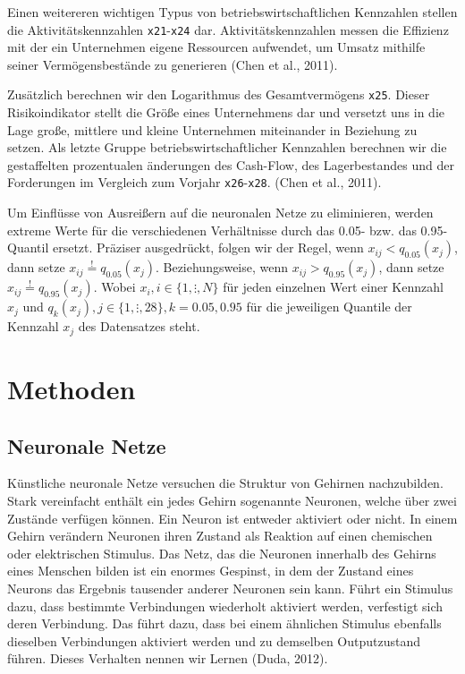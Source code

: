 \documentclass{article}
\begin{document}
Einen weitereren wichtigen Typus von betriebswirtschaftlichen Kennzahlen stellen die Aktivit{\"a}tskennzahlen \texttt{x21}-\texttt{x24} dar. Aktivit{\"a}tskennzahlen messen die Effizienz mit der ein Unternehmen eigene Ressourcen aufwendet, um Umsatz mithilfe seiner Verm{\"o}gensbest{\"a}nde zu generieren (Chen et al., 2011).

Zus{\"a}tzlich berechnen wir den Logarithmus des Gesamtverm{\"o}gens \texttt{x25}. Dieser Risikoindikator stellt die Gr{\"o}{\ss}e eines Unternehmens dar und versetzt uns in die Lage gro{\ss}e, mittlere und kleine Unternehmen miteinander in Beziehung zu setzen. Als letzte Gruppe betriebswirtschaftlicher Kennzahlen berechnen wir die gestaffelten prozentualen {\"a}nderungen des Cash-Flow, des Lagerbestandes und der Forderungen im Vergleich zum Vorjahr \texttt{x26}-\texttt{x28}. (Chen et al., 2011).

Um Einfl{\"u}sse von Ausrei{\ss}ern auf die neuronalen Netze zu eliminieren, werden extreme Werte f{\"u}r die verschiedenen Verh{\"a}ltnisse durch das 0.05- bzw. das 0.95-Quantil ersetzt. Pr{\"a}ziser ausgedr{\"u}ckt, folgen wir der Regel, wenn $x_{ij} < q_{0.05}(x_j)$, dann setze $x_{ij} \stackrel{!}{=} q_{0.05}(x_j)$. Beziehungsweise, wenn $x_{ij} > q_{0.95}(x_j)$, dann setze $x_{ij} \stackrel{!}{=} q_{0.95}(x_j)$. Wobei $x_i, i \in \{1, \vdots, N\}$ f{\"u}r jeden einzelnen Wert einer Kennzahl $x_j$ und $q_k(x_j), j \in \{1, \vdots, 28\}, k=0.05, 0.95$ f{\"u}r die jeweiligen Quantile der Kennzahl $x_j$ des Datensatzes steht.

\section{Methoden}
\subsection{Neuronale Netze}

K{\"u}nstliche neuronale Netze versuchen die Struktur von Gehirnen nachzubilden. Stark vereinfacht enth{\"a}lt ein jedes Gehirn sogenannte Neuronen, welche {\"u}ber zwei Zust{\"a}nde verf{\"u}gen k{\"o}nnen. Ein Neuron ist entweder aktiviert oder nicht. In einem Gehirn ver{\"a}ndern Neuronen ihren Zustand als Reaktion auf einen chemischen oder elektrischen Stimulus. Das Netz, das die Neuronen innerhalb des Gehirns eines Menschen bilden ist ein enormes Gespinst, in dem der Zustand eines Neurons das Ergebnis tausender anderer Neuronen sein kann. F{\"u}hrt ein Stimulus dazu, dass bestimmte Verbindungen wiederholt aktiviert werden, verfestigt sich deren Verbindung. Das f{\"u}hrt dazu, dass bei einem {\"a}hnlichen Stimulus ebenfalls dieselben Verbindungen aktiviert werden und zu demselben Outputzustand f{\"u}hren. Dieses Verhalten nennen wir Lernen (Duda, 2012).
\end{document}

